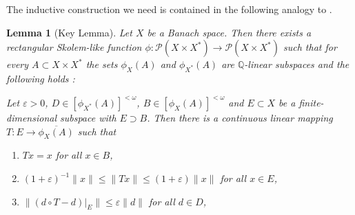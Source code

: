 \documentclass[11pt]{amsart}
\newtheorem{lemma}[thm]{Lemma}
\theoremstyle{definition}
\theoremstyle{remark}
\newcommand{\Rat}{\mathbb Q}
\newcommand{\PP}{\mathcal P}
\begin{document}
The inductive construction we need is contained in the following analogy to \cite[Lemma 2.1]{Abr15}.

\begin{lemma}[Key Lemma]\label{lem:keyLemma}
	Let $X$ be a Banach space. Then there exists a rectangular Skolem-like function $\phi:\PP(X\times X^*)\to \PP(X\times X^*)$ such that for every $A\subset X\times X^*$ the sets $\phi_X(A)$ and $\phi_{X^*}(A)$ are $\Rat$-linear subspaces and the following holds :
 
    Let $\varepsilon > 0$, $D \in [\phi_{X^*}(A)]^{<\omega}$, $B \in [\phi_X(A)]^{<\omega}$ and $E\subset X$ be a finite-dimensional subspace with $E \supset B$. Then there is a continuous linear mapping $T: E \to \overline{\phi_X(A)}$ such that
	\begin{enumerate}[label=\textnormal{(K\alph*)}]
		\item\label{list:keyLemma1} $Tx = x$ for all $x\in B$,
		\item\label{list:keyLemma2} $(1+\varepsilon)^{-1}\|x\| \leq \|T x \| \leq (1+\varepsilon) \|x\|$  for all $x \in E$,
		\item\label{list:keyLemma3}$\|(d\circ T - d)|_E\|\leq \varepsilon \|d\|$ for all $d\in D$,
	\end{enumerate}
\end{lemma}
\end{document}
